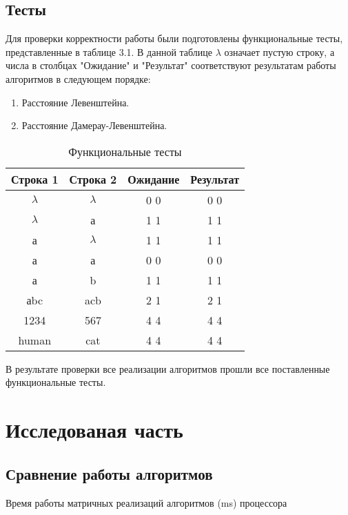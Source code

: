 \documentclass[12pt, a4paper]{report}
\begin{document}
	\newpage

	\section{Тесты}
	Для проверки корректности работы были подготовлены функциональные тесты, представленные в таблице 3.1. В данной таблице $\lambda$ означает пустую строку, а числа в столбцах "Ожидание" и "Результат" соответствуют результатам работы алгоритмов в следующем порядке:
	\begin{enumerate}
		\item Расстояние Левенштейна.
		\item Расстояние Дамерау-Левенштейна.
	\end{enumerate}

	\begin{table}[ht!]
		\caption{Функциональные тесты}
		\begin{center}
			\begin{tabular}{|c|c|c|c|}
			\hline
			\bf{Строка 1} & \bf{Строка 2} & \bf{Ожидание} & \bf{Результат}\\\hline
			$\lambda$ & $\lambda$ & 0 0 & 0 0\\\hline
			$\lambda$ & а & 1 1 & 1 1\\\hline
			а & $\lambda$ & 1 1 & 1 1\\\hline
			а & а & 0 0 & 0 0\\\hline
			а & b & 1 1 & 1 1\\\hline
			аbc & acb & 2 1 & 2 1\\\hline
			1234 & 567 & 4 4 & 4 4\\\hline
			human & cat & 4 4 & 4 4\\\hline
			\end{tabular}
		\end{center}
	\end{table}

	В результате проверки все реализации алгоритмов прошли все поставленные функциональные тесты.

	\chapter{Исследованая часть}
	\section{Сравнение работы алгоритмов}
	
	\begin{table}[ht!]
		\caption{Время работы матричных реализаций алгоритмов (ms) процессора}
		\begin{center}
		\end{center}
	\end{table}
	
\end{document}
